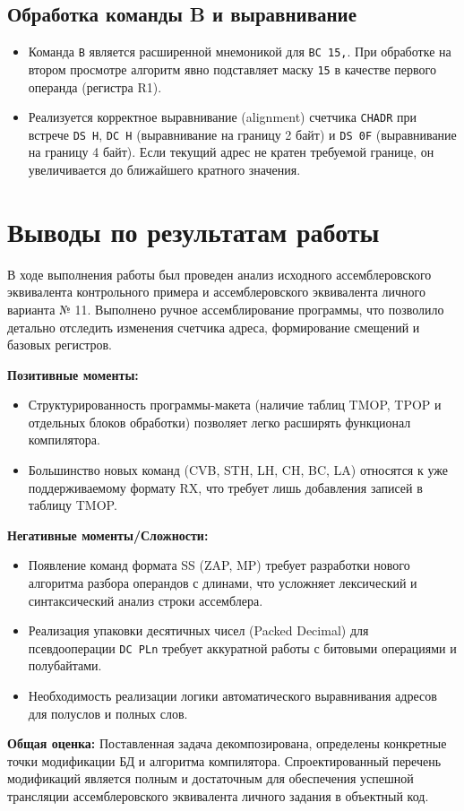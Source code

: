 \documentclass[12pt, a4paper]{article}
\begin{document}
\subsection{Обработка команды B и выравнивание}
\begin{itemize}
    \item Команда \texttt{B} является расширенной мнемоникой для \texttt{BC 15,}. При обработке на втором просмотре алгоритм явно подставляет маску \texttt{15} в качестве первого операнда (регистра R1).
    \item Реализуется корректное выравнивание (alignment) счетчика \texttt{CHADR} при встрече \texttt{DS H}, \texttt{DC H} (выравнивание на границу 2 байт) и \texttt{DS 0F} (выравнивание на границу 4 байт). Если текущий адрес не кратен требуемой границе, он увеличивается до ближайшего кратного значения.
\end{itemize}

\section{Выводы по результатам работы}

В ходе выполнения работы был проведен анализ исходного ассемблеровского эквивалента контрольного примера и ассемблеровского эквивалента личного варианта № 11. Выполнено ручное ассемблирование программы, что позволило детально отследить изменения счетчика адреса, формирование смещений и базовых регистров.

\textbf{Позитивные моменты:}
\begin{itemize}
    \item Структурированность программы-макета (наличие таблиц TMOP, TPOP и отдельных блоков обработки) позволяет легко расширять функционал компилятора.
    \item Большинство новых команд (CVB, STH, LH, CH, BC, LA) относятся к уже поддерживаемому формату RX, что требует лишь добавления записей в таблицу TMOP.
\end{itemize}

\textbf{Негативные моменты/Сложности:}
\begin{itemize}
    \item Появление команд формата SS (ZAP, MP) требует разработки нового алгоритма разбора операндов с длинами, что усложняет лексический и синтаксический анализ строки ассемблера.
    \item Реализация упаковки десятичных чисел (Packed Decimal) для псевдооперации \texttt{DC PLn} требует аккуратной работы с битовыми операциями и полубайтами.
    \item Необходимость реализации логики автоматического выравнивания адресов для полуслов и полных слов.
\end{itemize}

\textbf{Общая оценка:}
Поставленная задача декомпозирована, определены конкретные точки модификации БД и алгоритма компилятора. Спроектированный перечень модификаций является полным и достаточным для обеспечения успешной трансляции ассемблеровского эквивалента личного задания в объектный код.
\end{document}
